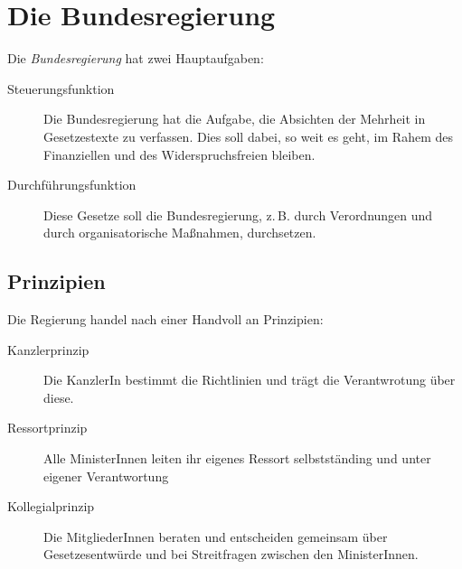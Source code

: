 \documentclass{article}
\begin{document}
\section{Die Bundesregierung}
Die \emph{Bundesregierung} hat zwei Hauptaufgaben:
\begin{description}
 \item[Steuerungsfunktion] Die Bundesregierung hat die Aufgabe, die Absichten der Mehrheit in Gesetzestexte zu verfassen. Dies soll dabei, so weit es geht, im Rahem des Finanziellen und des Widerspruchsfreien bleiben.
 \item[Durchführungsfunktion] Diese Gesetze soll die Bundesregierung, z.\,B. durch Verordnungen und durch organisatorische Maßnahmen, durchsetzen. 
\end{description} 
 
\subsection{Prinzipien}
Die Regierung handel nach einer Handvoll an Prinzipien:
\begin{description}
 \item[Kanzlerprinzip] Die KanzlerIn bestimmt die Richtlinien und trägt die Verantwrotung über diese.
 \item[Ressortprinzip] Alle MinisterInnen leiten ihr eigenes Ressort selbstständing und unter eigener Verantwortung
 \item[Kollegialprinzip] Die MitgliederInnen beraten und entscheiden gemeinsam über Gesetzesentwürde und bei Streitfragen zwischen den MinisterInnen. 
\end{description} 
\end{document}
